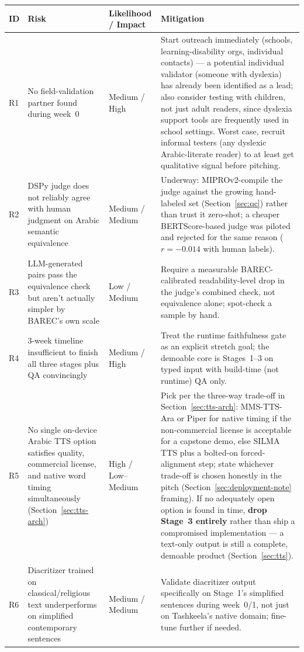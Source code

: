 \documentclass[11pt,a4paper]{article}
\begin{document}
\begin{center}
\small
\begin{tabular}{@{}p{0.6cm}p{4.4cm}p{3.6cm}p{5.6cm}@{}}
\toprule
\textbf{ID} & \textbf{Risk} & \textbf{Likelihood / Impact} & \textbf{Mitigation} \\
\midrule
R1 & No field-validation partner found during week~0 & Medium / High &
Start outreach immediately (schools, learning-disability orgs, individual
contacts) --- a potential individual validator (someone with dyslexia) has
already been identified as a lead; also consider testing with children, not
just adult readers, since dyslexia support tools are frequently used in
school settings. Worst case, recruit informal testers (any dyslexic
Arabic-literate reader) to at least get qualitative signal before pitching. \\
\addlinespace
R2 & DSPy judge does not reliably agree with human judgment on Arabic semantic
equivalence & Medium / Medium &
Underway: MIPROv2-compile the judge against the growing hand-labeled set
(Section~\ref{sec:qc}) rather than trust it zero-shot; a cheaper
BERTScore-based judge was piloted and rejected for the same reason
($r=-0.014$ with human labels). \\
\addlinespace
R3 & LLM-generated pairs pass the equivalence check but aren't actually
simpler by BAREC's own scale & Low / Medium &
Require a measurable BAREC-calibrated readability-level drop in the judge's
combined check, not equivalence alone; spot-check a sample by hand. \\
\addlinespace
R4 & 3-week timeline insufficient to finish all three stages plus QA
convincingly & Medium / High &
Treat the runtime faithfulness gate as an explicit stretch goal; the demoable
core is Stages~1--3 on typed input with build-time (not runtime) QA only. \\
\addlinespace
R5 & No single on-device Arabic TTS option satisfies quality, commercial
license, and native word timing simultaneously (Section~\ref{sec:tts-arch})
& High / Low--Medium &
Pick per the three-way trade-off in Section~\ref{sec:tts-arch}:
MMS-TTS-Ara or Piper for native timing if the non-commercial license is
acceptable for a capstone demo, else SILMA TTS plus a bolted-on
forced-alignment step; state whichever trade-off is chosen honestly in the
pitch (Section~\ref{sec:deployment-note} framing). If no adequately open
option is found in time, \textbf{drop Stage~3 entirely} rather than ship a
compromised implementation --- a text-only output is still a complete,
demoable product (Section~\ref{sec:tts}). \\
\addlinespace
R6 & Diacritizer trained on classical/religious text underperforms on
simplified contemporary sentences & Medium / Medium &
Validate diacritizer output specifically on Stage~1's simplified sentences
during week~0/1, not just on Tashkeela's native domain; fine-tune further if
needed. \\
\bottomrule
\end{tabular}
\label{tab:risks}
\end{center}
\end{document}
